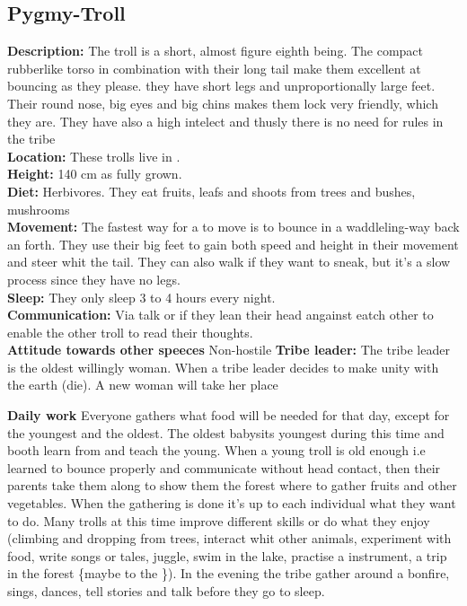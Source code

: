 \documentclass{article}
\begin{document}
\subsection{Pygmy-Troll}
\label{troll}
\textbf{Description:} The troll is a short, almost figure eighth being. The compact rubberlike torso in combination with their long tail make them excellent at bouncing as they please. they have short legs and unproportionally large feet. Their round nose, big eyes and big chins makes them lock very friendly, which they are. They have also a high intelect and thusly there is no need for rules in the tribe\\ 
\textbf{Location:} These trolls live in .\\
\textbf{Height:} 140 cm as fully grown.\\
\textbf{Diet:} Herbivores. They eat fruits, leafs and shoots from trees and bushes, mushrooms 
\\\textbf{Movement: } The fastest way for a  to move is to bounce in a waddleling-way back an forth. They use their big feet to gain both speed and height in their movement and steer whit the tail. They can also walk if they want to sneak, but it's a slow process since they have no legs.
\\\textbf{Sleep:} They only sleep 3 to 4 hours every night.
\\\textbf{Communication: } Via talk or if they lean their head angainst eatch other to enable the other troll to read their thoughts.
\\\textbf{Attitude towards other speeces} Non-hostile
\textbf{Tribe leader:}
The tribe leader is the oldest willingly woman. When a tribe leader decides to make unity with the earth (die). A new woman will take her place

\textbf{Daily work}
Everyone gathers what food will be needed for that day, except for the youngest and the oldest. The oldest babysits youngest during this time and booth learn from and teach the young. When a young troll is old enough i.e learned to bounce properly and communicate without head contact, then their parents take them along to show them the forest where to gather fruits and other vegetables.
When the gathering is done it's up to each individual what they want to do. Many trolls at this time improve different skills or do what they enjoy (climbing and dropping from trees, interact whit other animals, experiment with food, write songs or tales, juggle, swim in the lake, practise a instrument, a trip in the forest \{maybe to the \}).
In the evening the tribe gather around a bonfire, sings, dances, tell stories and talk before they go to sleep.
\end{document}
